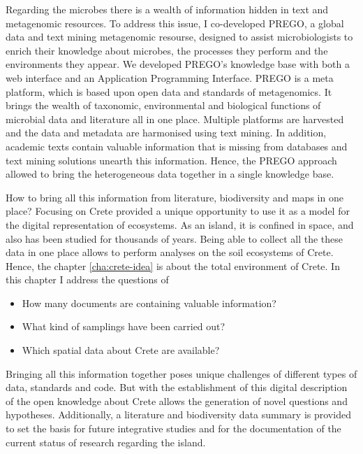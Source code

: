 \documentclass[
11pt, %
english, %
singlespacing, %
liststotoc, %
toctotoc, %
headsepline, %
]{MastersDoctoralThesis} %
\begin{document}
Regarding the microbes there is a wealth of information hidden in text and metagenomic resources.
To address this issue, I co-developed PREGO, a global data and text mining metagenomic resourse, designed to assist microbiologists
to enrich their knowledge about microbes, the processes they perform and the environments 
they appear. We developed PREGO's knowledge base with both a web interface and an Application Programming Interface.
PREGO is a meta platform, which is based upon open data and standards of metagenomics. 
It brings the wealth of taxonomic, environmental and biological functions of 
microbial data and literature all in one place. Multiple platforms are harvested and the data 
and metadata are harmonised using text mining. In addition, academic texts contain 
valuable information that is missing from databases and text mining solutions unearth 
this information. Hence, the PREGO approach allowed to bring the heterogeneous
data together in a single knowledge base. 

How to bring all this information from literature, biodiversity and maps in one place? Focusing on Crete
provided a unique opportunity to use it as a model for the digital representation of ecosystems. 
As an island, it is confined in space, and also has been studied for thousands of years.
Being able to collect all the these data in one place allows to perform analyses on the soil ecosystems of Crete.
Hence, the chapter \ref{cha:crete-idea} is about the total environment of Crete.
In this chapter I address the questions of 

\begin{itemize}
    \item How many documents are containing valuable information?
    \item What kind of samplings have been carried out?
    \item Which spatial data about Crete are available? 
\end{itemize}

Bringing all this information together poses unique challenges of different types of data, standards and code. 
But with the establishment of this digital description of the open knowledge about Crete allows the generation of novel questions and hypotheses.
Additionally, a literature and biodiversity data summary is 
provided to set the basis for future integrative studies and for the documentation of the current status of 
research regarding the island.
\end{document}

